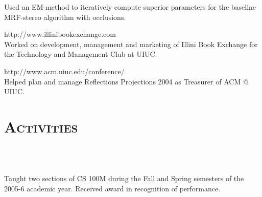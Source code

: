 \begin{resume}
\begin{position}
Used an EM-method to iteratively compute superior parameters for the baseline MRF-stereo algorithm with occlusions.
\end{position}

\begin{position}
http://www.illinibookexchange.com\\
Worked on development, management and marketing of Illini Book Exchange for the Technology and Management Club at UIUC. 
\end{position}

\begin{position}
http://www.acm.uiuc.edu/conference/\\
Helped plan and manage Reflections Projections 2004 as Treasurer of ACM @ UIUC.
\end{position}








\section{\textsc{Activities}}

\begin{formatb}
  \\
  \body\\
\end{formatb}

\begin{position}
Taught two sections of CS 100M during the Fall and Spring semesters of the 2005-6 academic year.  Received award in recognition of performance.
\end{position}


\end{resume}
